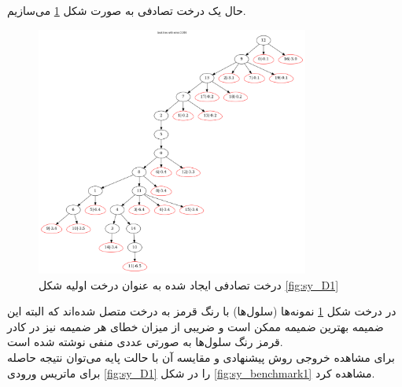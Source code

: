 حال یک درخت تصادفی به صورت شکل \ref{fig:sy_initial_T1} می‌سازیم.
\begin{figure}[!ht]
	\centering
	\includegraphics[width=0.8\textwidth]{img/chaps/er/initial_s_tree}
	\caption{‌درخت تصادفی ایجاد شده به عنوان درخت اولیه شکل \ref*{fig:sy_D1}}
	\label{fig:sy_initial_T1}
\end{figure}
در درخت شکل  \ref{fig:sy_initial_T1} نمونه‌ها (سلول‌ها) با رنگ قرمز به درخت متصل شده‌اند که البته این ضمیمه بهترین ضمیمه ممکن است و ضریبی از میزان خطای هر ضمیمه نیز در کادر قرمز رنگ سلول‌ها به صورتی عددی منفی نوشته شده است. 
\\
برای مشاهده خروجی روش پیشنهادی و مقایسه آن با حالت پایه می‌توان نتیجه حاصله برای ماتریس ورودی \ref{fig:sy_D1} را در شکل \ref{fig:sy_benchmark1} مشاهده کرد.



